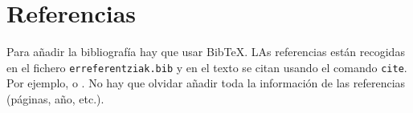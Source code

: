 \section{Referencias}

Para añadir la bibliografía hay que usar BibTeX. LAs referencias están recogidas en el fichero \texttt{erreferentziak.bib} y en el texto se citan usando el comando \texttt{cite}. Por ejemplo, \cite{Shahbaba2011} o \cite{Efron1994, Rmanual, Subramanian2005gene}. No hay que olvidar añadir toda la información de las referencias (páginas, año, etc.).